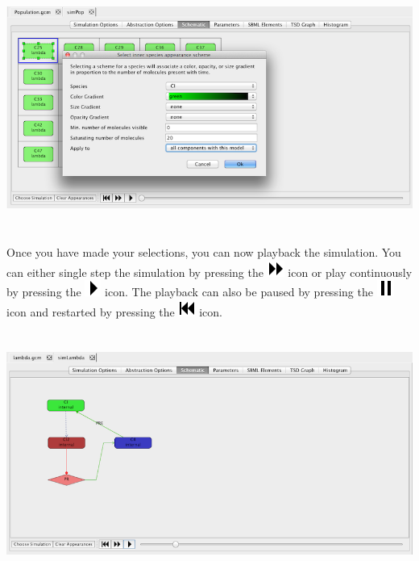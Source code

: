\documentclass[titlepage,11pt]{article}
\begin{document}
\begin{center}
\includegraphics[height=80mm]{screenshots/compAppearances}
\end{center}

Once you have made your selections, you can now playback the simulation.  You can either single step the simulation by pressing the \includegraphics{../gui/icons/modelview/movie/single_step} icon or play continuously by pressing the \includegraphics{../gui/icons/modelview/movie/play} icon.  The playback can also be paused by pressing the \includegraphics{../gui/icons/modelview/movie/pause} icon and restarted by pressing the  \includegraphics{../gui/icons/modelview/movie/rewind} icon. 

\begin{center}
\includegraphics[height=80mm]{screenshots/movieView}
\end{center}
\end{document}
